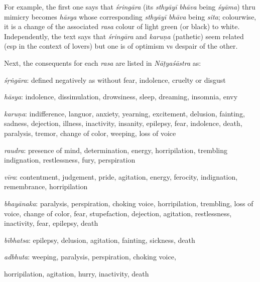 For example, the first one says that \textsl{śringāra} (its \textsl{sthyāyī} \textsl{bhāva} being \textsl{śyāma}) thru mimicry becomes \textsl{hāsya} whose corresponding \textsl{sthyāyī bhāva} being \textsl{sita}; colourwise, it is a change of the associated \textsl{rasa} colour of light green (or black) to white. Independently, the text says that \textsl{śringāra} and \textsl{karuṇa} (pathetic) seem related (esp in the context of lovers) but one is of optimism vs despair of the other. 

\newpage

Next, the consequents for each \textsl{rasa} are listed in \textsl{Nāṭyaśāstra} as: 

\textsl{śṛṅgāra}: defined negatively as without fear, indolence, cruelty or disgust

\textsl{hāsya}: indolence, dissimulation, drowsiness, sleep, dreaming, insomnia, envy

\textsl{karuṇa}: indifference, languor, anxiety, yearning, excitement, delusion, fainting, sadness, dejection, illness, inactivity, insanity, epilepsy, fear, indolence, death, paralysis, tremor, change of color, weeping, loss of voice

\textsl{raudra}: presence of mind, determination, energy, horripilation, trembling indignation, restlessness, fury, perspiration

\textsl{vīra}: contentment, judgement, pride, agitation, energy, ferocity, indignation, remembrance, horripilation

\textsl{bhayānaka}: paralysis, perspiration, choking voice, horripilation, trembling, loss of voice, change of color, fear, stupefaction, dejection, agitation, restlessness, inactivity, fear, epilepsy, death

\textsl{bībhatsa}: epilepsy, delusion, agitation, fainting, sickness, death

\textsl{adbhuta}: weeping, paralysis, perspiration, choking voice, 

horripilation, agitation, hurry, inactivity, death

